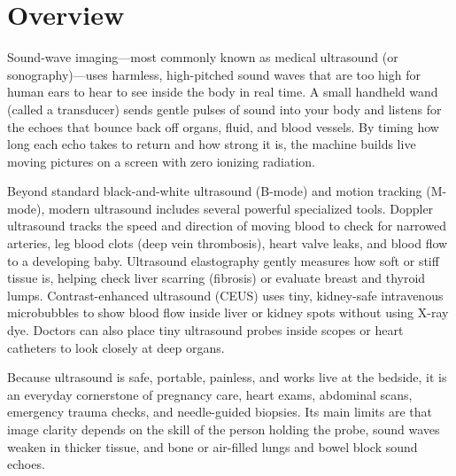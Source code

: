 \label{ch:infographic-sound-imaging-overview}

\section{Overview}

Sound-wave imaging---most commonly known as medical ultrasound (or sonography)---uses harmless, high-pitched sound waves that are too high for human ears to hear to see inside the body in real time. A small handheld wand (called a transducer) sends gentle pulses of sound into your body and listens for the echoes that bounce back off organs, fluid, and blood vessels. By timing how long each echo takes to return and how strong it is, the machine builds live moving pictures on a screen with zero ionizing radiation.

Beyond standard black-and-white ultrasound (B-mode) and motion tracking (M-mode), modern ultrasound includes several powerful specialized tools. Doppler ultrasound tracks the speed and direction of moving blood to check for narrowed arteries, leg blood clots (deep vein thrombosis), heart valve leaks, and blood flow to a developing baby. Ultrasound elastography gently measures how soft or stiff tissue is, helping check liver scarring (fibrosis) or evaluate breast and thyroid lumps. Contrast-enhanced ultrasound (CEUS) uses tiny, kidney-safe intravenous microbubbles to show blood flow inside liver or kidney spots without using X-ray dye. Doctors can also place tiny ultrasound probes inside scopes or heart catheters to look closely at deep organs.

Because ultrasound is safe, portable, painless, and works live at the bedside, it is an everyday cornerstone of pregnancy care, heart exams, abdominal scans, emergency trauma checks, and needle-guided biopsies. Its main limits are that image clarity depends on the skill of the person holding the probe, sound waves weaken in thicker tissue, and bone or air-filled lungs and bowel block sound echoes.

